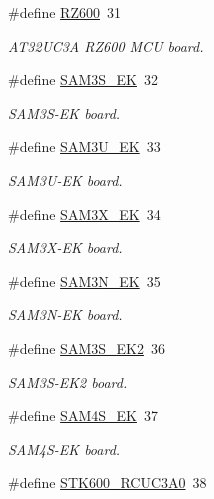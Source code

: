 \begin{DoxyCompactItemize}
\#define \mbox{\hyperlink{group__group__common__boards_ga4c22f34cf2ee08f07ce959d9a3009d85}{R\+Z600}}~31
\begin{DoxyCompactList}\small\item\em A\+T32\+U\+C3A R\+Z600 M\+CU board. \end{DoxyCompactList}\item 
\#define \mbox{\hyperlink{group__group__common__boards_ga35b2c40ce0679c6c73a010aa2c336a18}{S\+A\+M3\+S\+\_\+\+EK}}~32
\begin{DoxyCompactList}\small\item\em S\+A\+M3\+S-\/\+EK board. \end{DoxyCompactList}\item 
\#define \mbox{\hyperlink{group__group__common__boards_gab5023c1363a78928b59a1c58c9d424b7}{S\+A\+M3\+U\+\_\+\+EK}}~33
\begin{DoxyCompactList}\small\item\em S\+A\+M3\+U-\/\+EK board. \end{DoxyCompactList}\item 
\#define \mbox{\hyperlink{group__group__common__boards_ga6cb4632f143ec6e1ad2f1f21408a95dc}{S\+A\+M3\+X\+\_\+\+EK}}~34
\begin{DoxyCompactList}\small\item\em S\+A\+M3\+X-\/\+EK board. \end{DoxyCompactList}\item 
\#define \mbox{\hyperlink{group__group__common__boards_ga817c9dc11525515f03cdadfc14106171}{S\+A\+M3\+N\+\_\+\+EK}}~35
\begin{DoxyCompactList}\small\item\em S\+A\+M3\+N-\/\+EK board. \end{DoxyCompactList}\item 
\#define \mbox{\hyperlink{group__group__common__boards_gaf6824772f924cd5db7c0539891333187}{S\+A\+M3\+S\+\_\+\+E\+K2}}~36
\begin{DoxyCompactList}\small\item\em S\+A\+M3\+S-\/\+E\+K2 board. \end{DoxyCompactList}\item 
\#define \mbox{\hyperlink{group__group__common__boards_ga3fd374ef815e8306ca25da0ab37e0b79}{S\+A\+M4\+S\+\_\+\+EK}}~37
\begin{DoxyCompactList}\small\item\em S\+A\+M4\+S-\/\+EK board. \end{DoxyCompactList}\item 
\#define \mbox{\hyperlink{group__group__common__boards_ga138d52c61cc6474466dd4ce92e3c9ed0}{S\+T\+K600\+\_\+\+R\+C\+U\+C3\+A0}}~38

\end{DoxyCompactItemize}
